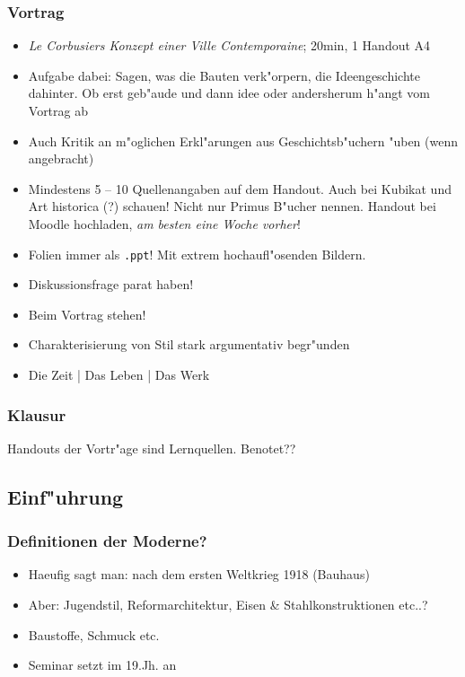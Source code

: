 \documentclass[a5paper]{scrartcl}
\begin{document}
\subsubsection{Vortrag}

\begin{itemize}
    \item \emph{Le Corbusiers Konzept einer Ville Contemporaine}; 20min, 1 Handout A4
    \item Aufgabe dabei: Sagen, was die Bauten verk"orpern, die Ideengeschichte dahinter. Ob erst geb"aude und dann idee oder andersherum h"angt vom Vortrag ab
    \item Auch Kritik an m"oglichen Erkl"arungen aus Geschichtsb"uchern "uben (wenn angebracht)
    \item Mindestens 5 -- 10 Quellenangaben auf dem Handout. Auch bei Kubikat und Art historica (?) schauen! Nicht nur Primus B"ucher nennen. Handout bei Moodle hochladen, \emph{am besten eine Woche vorher}! 
    \item Folien immer als \texttt{.ppt}! Mit extrem hochaufl"osenden Bildern.
    \item Diskussionsfrage parat haben!
    \item Beim Vortrag stehen!
    \item Charakterisierung von Stil stark argumentativ begr"unden
    \item Die Zeit | Das Leben | Das Werk
\end{itemize}



\subsubsection{Klausur}
Handouts der Vortr"age sind Lernquellen.
Benotet??

\subsection{Einf"uhrung}
\subsubsection{Definitionen der Moderne?}
\begin{itemize}
    \item Haeufig sagt man: nach dem ersten Weltkrieg 1918 (Bauhaus)
    \item Aber: Jugendstil, Reformarchitektur, Eisen \& Stahlkonstruktionen etc..?
    \item Baustoffe, Schmuck etc.
    \item Seminar setzt im 19.Jh. an
\end{itemize}
\end{document}
